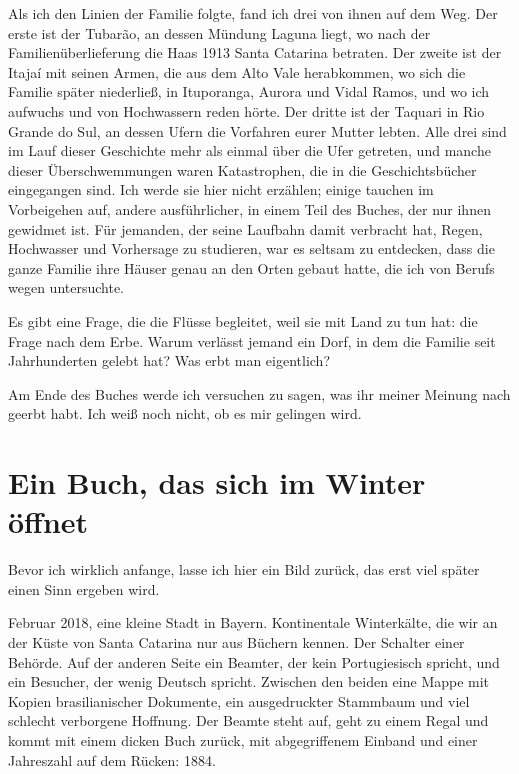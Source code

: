 \documentclass[
  ngerman,
  11pt,
  openany]{book}
\begin{document}
Als ich den Linien der Familie folgte, fand ich drei von ihnen auf dem
Weg. Der erste ist der Tubarão, an dessen Mündung Laguna liegt, wo nach
der Familienüberlieferung die Haas 1913 Santa Catarina betraten. Der
zweite ist der Itajaí mit seinen Armen, die aus dem Alto Vale
herabkommen, wo sich die Familie später niederließ, in Ituporanga,
Aurora und Vidal Ramos, und wo ich aufwuchs und von Hochwassern reden
hörte. Der dritte ist der Taquari in Rio Grande do Sul, an dessen Ufern
die Vorfahren eurer Mutter lebten. Alle drei sind im Lauf dieser
Geschichte mehr als einmal über die Ufer getreten, und manche dieser
Überschwemmungen waren Katastrophen, die in die Geschichtsbücher
eingegangen sind. Ich werde sie hier nicht erzählen; einige tauchen im
Vorbeigehen auf, andere ausführlicher, in einem Teil des Buches, der nur
ihnen gewidmet ist. Für jemanden, der seine Laufbahn damit verbracht
hat, Regen, Hochwasser und Vorhersage zu studieren, war es seltsam zu
entdecken, dass die ganze Familie ihre Häuser genau an den Orten gebaut
hatte, die ich von Berufs wegen untersuchte.

Es gibt eine Frage, die die Flüsse begleitet, weil sie mit Land zu tun
hat: die Frage nach dem Erbe. Warum verlässt jemand ein Dorf, in dem die
Familie seit Jahrhunderten gelebt hat? Was erbt man eigentlich?

Am Ende des Buches werde ich versuchen zu sagen, was ihr meiner Meinung
nach geerbt habt. Ich weiß noch nicht, ob es mir gelingen wird.

\section{Ein Buch, das sich im Winter
öffnet}\label{ein-buch-das-sich-im-winter-uxf6ffnet}

Bevor ich wirklich anfange, lasse ich hier ein Bild zurück, das erst
viel später einen Sinn ergeben wird.

Februar 2018, eine kleine Stadt in Bayern. Kontinentale Winterkälte, die
wir an der Küste von Santa Catarina nur aus Büchern kennen. Der Schalter
einer Behörde. Auf der anderen Seite ein Beamter, der kein Portugiesisch
spricht, und ein Besucher, der wenig Deutsch spricht. Zwischen den
beiden eine Mappe mit Kopien brasilianischer Dokumente, ein
ausgedruckter Stammbaum und viel schlecht verborgene Hoffnung. Der
Beamte steht auf, geht zu einem Regal und kommt mit einem dicken Buch
zurück, mit abgegriffenem Einband und einer Jahreszahl auf dem Rücken:
1884.
\end{document}
